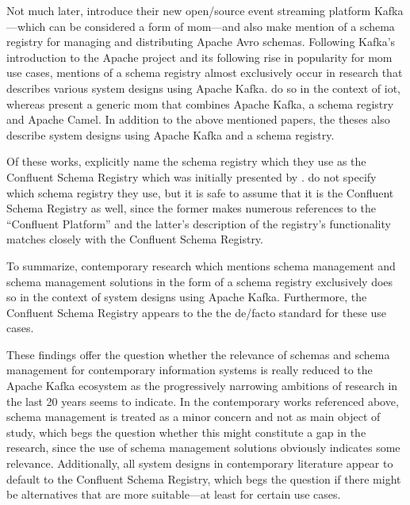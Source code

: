 Not much later, \cite{kreps_kafka_2011} introduce their new open\-/source event streaming platform Kafka---which can be considered a form of \gls{mom}---and also make mention of a schema registry for managing and distributing Apache Avro schemas.
Following Kafka's introduction to the Apache project and its following rise in popularity for \gls{mom} use cases, mentions of a schema registry almost exclusively occur in research that describes various system designs using Apache Kafka.
\cites{muller_iot_2017}{radchenko_micro-workflows_2018}{ranjan_radar-base_2019} do so in the context of \gls{iot}, whereas \cite{g_b_high_2021} present a generic \gls{mom} that combines Apache Kafka, a schema registry and Apache Camel.
In addition to the above mentioned papers, the theses \cites{dessalegn_muruts_multi-tenant_2016}{auer_distributed_2017}{korhonen_using_2019} also describe system designs using Apache Kafka and a schema registry.

Of these works, \cites{muller_iot_2017}{radchenko_micro-workflows_2018}{dessalegn_muruts_multi-tenant_2016}{auer_distributed_2017}{korhonen_using_2019} explicitly name the schema registry which they use as the Confluent Schema Registry which was initially presented by \cite{kreps_kafka_2011}.
\cites{ranjan_radar-base_2019}{g_b_high_2021} do not specify which schema registry they use, but it is safe to assume that it is the Confluent Schema Registry as well, since the former makes numerous references to the \enquote{Confluent Platform} and the latter's description of the registry's functionality matches closely with the Confluent Schema Registry.

To summarize, contemporary research which mentions schema management and schema management solutions in the form of a schema registry exclusively does so in the context of system designs using Apache Kafka.
Furthermore, the Confluent Schema Registry appears to the the de\-/facto standard for these use cases.

These findings offer the question whether the relevance of schemas and schema management for contemporary information systems is really reduced to the Apache Kafka ecosystem as the progressively narrowing ambitions of research in the last 20 years seems to indicate.
In the contemporary works referenced above, schema management is treated as a minor concern and not as main object of study, which begs the question whether this might constitute a gap in the research, since the use of schema management solutions obviously indicates some relevance.
Additionally, all system designs in contemporary literature appear to default to the Confluent Schema Registry, which begs the question if there might be alternatives that are more suitable---at least for certain use cases.

